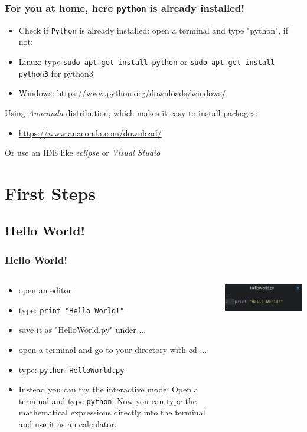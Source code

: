 \documentclass{beamer}
\begin{document}
\begin{frame}
\frametitle{For you at home, here \texttt{python} is already installed!}
	\begin{itemize}
		\item Check if \texttt{Python} is already installed: open a terminal and type "python", if not:
		\item Linux: type \texttt{sudo apt-get install python} or \texttt{sudo apt-get install python3} for python3
		\item Windows: \url{https://www.python.org/downloads/windows/}
	\end{itemize}
	Using \textit{Anaconda} distribution, which makes it easy to install packages:
	\begin{itemize}
		\item \url{https://www.anaconda.com/download/}
	\end{itemize}
	Or use an IDE like \textit{eclipse} or \textit{Visual Studio}
\end{frame}

\section{First Steps}
\subsection{Hello World!}

\begin{frame}
\frametitle{ Hello World!}
	\begin{columns}[T]
		\begin{column}[T]{7cm}
			\begin{itemize}
				\item open an editor 
				\item type: \texttt{print "Hello World!"}
				\item save it as "HelloWorld.py" under ...
				\item open a terminal and go to your directory with cd ...
				\item type: \texttt{python HelloWorld.py}
				\item Instead you can try the interactive mode: Open a terminal and type \texttt{python}. Now you can type the mathematical expressions directly into the terminal and use it as an calculator.
			\end{itemize}
		\end{column}
		\begin{column}[T]{5cm}
			\includegraphics[width = 1\textwidth]{HelloWorld.pdf}
		\end{column}
	\end{columns}
\end{frame}
\end{document}
